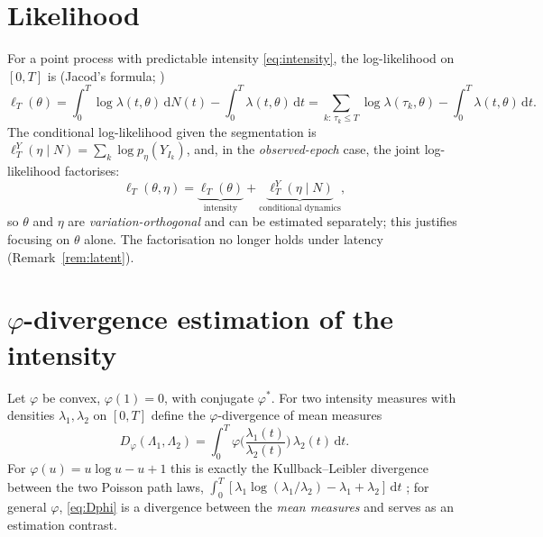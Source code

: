 \documentclass[11pt]{article}
\newcommand{\dd}{\,\mathrm{d}}
\newcommand{\Dphi}{D_\varphi}
\begin{document}
\section{Likelihood}\label{sec:lik}
For a point process with predictable intensity \eqref{eq:intensity}, the
log-likelihood on $[0,T]$ is (Jacod's formula; \citealp{bremaud1981,abgk1993})
\begin{equation}\label{eq:loglik}
\ell_T(\theta)=\int_0^T \log\lambda(t,\theta)\dd N(t)-\int_0^T\lambda(t,\theta)\dd t
=\sum_{k:\,\tau_k\le T}\log\lambda(\tau_k,\theta)-\int_0^T\lambda(t,\theta)\dd t .
\end{equation}
The conditional log-likelihood given the segmentation is
$\ell_T^{Y}(\eta\mid N)=\sum_k \log p_\eta(Y_{I_k})$, and, in the
\emph{observed-epoch} case, the joint log-likelihood factorises:
\begin{equation}\label{eq:joint}
\ell_T(\theta,\eta)=\underbrace{\ell_T(\theta)}_{\text{intensity}}
+\underbrace{\ell_T^{Y}(\eta\mid N)}_{\text{conditional dynamics}} ,
\end{equation}
so $\theta$ and $\eta$ are \emph{variation-orthogonal} and can be estimated
separately; this justifies focusing on $\theta$ alone. The factorisation no longer holds
under latency (Remark~\ref{rem:latent}).

\section{$\varphi$-divergence estimation of the intensity}\label{sec:phi}
Let $\varphi$ be convex, $\varphi(1)=0$, with conjugate
$\varphi^\ast$. For two intensity measures with densities $\lambda_1,\lambda_2$ on
$[0,T]$ define the $\varphi$-divergence of mean measures
\begin{equation}\label{eq:Dphi}
\Dphi(\Lambda_1,\Lambda_2)=\int_0^T \varphi\!\Big(\frac{\lambda_1(t)}{\lambda_2(t)}\Big)\,\lambda_2(t)\dd t .
\end{equation}
For $\varphi(u)=u\log u-u+1$ this is exactly the Kullback--Leibler divergence
between the two Poisson path laws,
$\int_0^T[\lambda_1\log(\lambda_1/\lambda_2)-\lambda_1+\lambda_2]\dd t$
\citep{bremaud1981}; for general $\varphi$, \eqref{eq:Dphi} is a divergence
between the \emph{mean measures} and serves as an estimation contrast.
\end{document}
